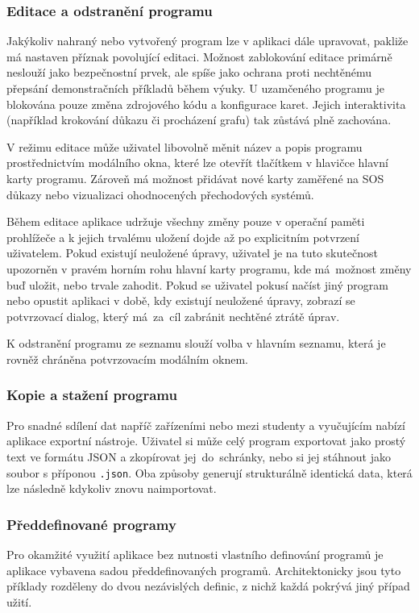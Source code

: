 \subsubsection*{Editace a odstranění programu}
Jakýkoliv nahraný nebo vytvořený program lze v aplikaci dále upravovat, pakliže má nastaven příznak povolující editaci. 
Možnost zablokování editace primárně neslouží jako bezpečnostní prvek, ale spíše jako ochrana proti nechtěnému přepsání demonstračních příkladů během výuky. 
U uzamčeného programu je blokována pouze změna zdrojového kódu a konfigurace karet. 
Jejich interaktivita (například krokování důkazu či procházení grafu) tak zůstává plně zachována.

V režimu editace může uživatel libovolně měnit název a popis programu prostřednictvím modálního okna, které lze otevřít tlačítkem v hlavičce hlavní karty programu. 
Zároveň má možnost přidávat nové karty zaměřené na SOS důkazy nebo vizualizaci ohodnocených přechodových systémů. 

Během editace aplikace udržuje všechny změny pouze v operační paměti prohlížeče a k jejich trvalému uložení dojde až po explicitním potvrzení uživatelem. 
Pokud existují neuložené úpravy, uživatel je na tuto skutečnost upozorněn v pravém horním rohu hlavní karty programu, kde má~možnost změny buď uložit, nebo trvale zahodit. 
Pokud se uživatel pokusí načíst jiný program nebo opustit aplikaci v době, kdy existují neuložené úpravy, zobrazí se potvrzovací dialog, který má~za~cíl zabránit nechtěné ztrátě úprav. 

K odstranění programu ze seznamu slouží volba v hlavním seznamu, která je rovněž chráněna potvrzovacím modálním oknem.

\subsubsection*{Kopie a stažení programu}
Pro snadné sdílení dat napříč zařízeními nebo mezi studenty a vyučujícím nabízí aplikace exportní nástroje. 
Uživatel si může celý program exportovat jako prostý text ve formátu JSON a zkopírovat jej~do~schránky, nebo si jej stáhnout jako soubor s příponou \texttt{.json}. 
Oba způsoby generují strukturálně identická data, která lze následně kdykoliv znovu naimportovat.

\subsubsection*{Předdefinované programy}
\label{sec:preddefinovane_programy}
Pro okamžité využití aplikace bez nutnosti vlastního definování programů je aplikace vybavena sadou předdefinovaných programů. 
Architektonicky jsou tyto příklady rozděleny do dvou nezávislých definic, z nichž každá pokrývá jiný případ užití.

